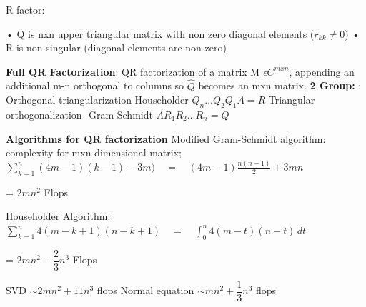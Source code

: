 \documentclass[]{finalproject}
\begin{document}
\begin{flushleft}
R-factor:
\begin{flushleft}
• Q is nxn upper triangular matrix with non zero diagonal elements ($r_{kk} \not= 0 $) \newline
• R is non-singular (diagonal elements are non-zero)
\end{flushleft}
\textbf{Full QR Factorization}: \cite{qr} \newline
QR factorization of a matrix M $\epsilon C^{mxn}$, appending an additional m-n orthogonal to columns so $\hat{Q}$ becomes an mxn matrix. \newline
\textbf{2 Group:} :  \newline
Orthogonal triangularization-Householder  $ Q_{n}...Q_{2}Q_{1}A = R $ \newline
Triangular orthogonalization- Gram-Schmidt $ AR_{1}R_{2}...R_{n} = Q $ \newline \newline

\textbf{Algorithms for QR factorization} \newline
Modified Gram-Schmidt algorithm: complexity for mxn dimensional matrix; $\sum_{k=1}^{n} (4m-1)(k-1)-3m) \quad = \quad  (4m-1)\frac{n(n-1)}{2}+3mn$
\begin{center}
  = $2mn^{2}$ Flops
\end{center}
Householder Algorithm:\newline
$\sum_{k=1}^{n} 4(m-k+1)(n-k+1) \quad = \quad  \int_{0}^{n} 4(m-t)(n-t) \,dt $
\begin{center}
  = $2mn^{2} - \dfrac{2}{3}n^{3}$ Flops
\end{center}
SVD $\sim 2mn^{2} + 11n^{3} $ flops \newline 
Normal equation $\sim mn^{2} + \dfrac{1}{3}n^{3} $ flops \newline

\end{flushleft}
\end{document}
